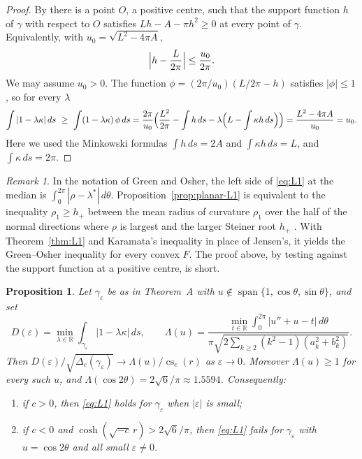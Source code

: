 \documentclass[11pt]{amsart}
\newtheorem{proposition}[theorem]{Proposition}
\theoremstyle{definition}
\theoremstyle{remark}
\newtheorem{remark}[theorem]{Remark}
\numberwithin{equation}{section}
\DeclareMathOperator{\cs}{cs}
\DeclareMathOperator{\spn}{span}
\newcommand{\RR}{\mathbb{R}}
\newcommand{\eps}{\varepsilon}
\begin{document}
\begin{proof}
By \cite{Ga90b} there is a point $O$, a positive centre, such that the support function $h$ of $\gamma$ with respect to $O$ satisfies $Lh-A-\pi h^2\ge0$ at every point of $\gamma$. Equivalently, with $u_0=\sqrt{L^2-4\pi A}$,
\[
\Bigl|h-\frac L{2\pi}\Bigr|\le\frac{u_0}{2\pi}.
\]
We may assume $u_0>0$. The function $\phi=(2\pi/u_0)(L/2\pi-h)$ satisfies $|\phi|\le1$, so for every $\lambda$
\[
\int|1-\lambda\kappa|\,ds\ \ge\ \int(1-\lambda\kappa)\,\phi\,ds=\frac{2\pi}{u_0}\Bigl(\frac{L^2}{2\pi}-\int h\,ds-\lambda\Bigl(L-\int\kappa h\,ds\Bigr)\Bigr)=\frac{L^2-4\pi A}{u_0}=u_0 .
\]
Here we used the Minkowski formulas $\int h\,ds=2A$ and $\int\kappa h\,ds=L$, and $\int\kappa\,ds=2\pi$.
\end{proof}

\begin{remark}
In the notation of Green and Osher, the left side of \eqref{eq:L1} at the median is $\int_0^{2\pi}|\rho-\lambda^*|\,d\theta$. Proposition~\ref{prop:planar-L1} is equivalent to the inequality $\rho_1\ge h_+$ between the mean radius of curvature $\rho_1$ over the half of the normal directions where $\rho$ is largest and the larger Steiner root $h_+$ \cite{GO99,PY08,GPY15}. With Theorem~\ref{thm:L1} and Karamata's inequality in place of Jensen's, it yields the Green--Osher inequality for every convex $F$. The proof above, by testing against the support function at a positive centre, is short.
\end{remark}

\begin{proposition}\label{prop:local-L1}
Let $\gamma_\eps$ be as in Theorem~A with $u\notin\spn\{1,\cos\theta,\sin\theta\}$, and set
\[
D(\eps)=\min_{\lambda\in\RR}\int_{\gamma_\eps}|1-\lambda\kappa|\,ds,\qquad
\Lambda(u)=\frac{\min_{t\in\RR}\int_0^{2\pi}|u''+u-t|\,d\theta}{\pi\sqrt{2\sum_{k\ge2}(k^2-1)(a_k^2+b_k^2)}} .
\]
Then $D(\eps)/\sqrt{\Delta_c(\gamma_\eps)}\to\Lambda(u)/\cs_c(r)$ as $\eps\to0$. Moreover $\Lambda(u)\ge1$ for every such $u$, and $\Lambda(\cos2\theta)=2\sqrt6/\pi\approx1.5594$. Consequently:
\begin{enumerate}[label=\textup{(\alph*)}]
\item if $c>0$, then \eqref{eq:L1} holds for $\gamma_\eps$ when $|\eps|$ is small;
\item if $c<0$ and $\cosh(\sqrt{-c}\,r)>2\sqrt6/\pi$, then \eqref{eq:L1} fails for $\gamma_\eps$ with $u=\cos2\theta$ and all small $\eps\ne0$.
\end{enumerate}
\end{proposition}
\end{document}
